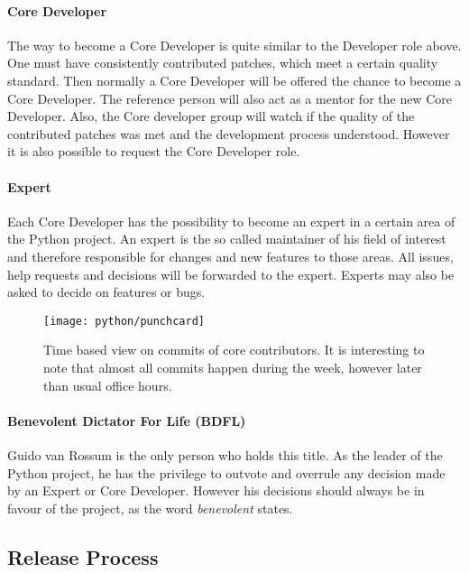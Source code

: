 \paragraph{Core Developer}

The way to become a Core Developer is quite similar to the Developer role
above. One must have consistently contributed patches, which meet a certain
quality standard. Then normally a Core Developer will be offered the chance to
become a Core Developer. The reference person will also act as a mentor for the
new Core Developer. Also, the Core developer group will watch if the quality of
the contributed patches was met and the development process understood. However
it is also possible to request the Core Developer role.

\paragraph{Expert}

Each Core Developer has the possibility to become an expert in a certain area
of the Python project. An expert is the so called maintainer of his field of
interest and therefore responsible for changes and new features to those areas.
All issues, help requests and decisions will be forwarded to the expert.
Experts may also be asked to decide on features or bugs.

\begin{figure}[hbtp]
  \centering
  \texttt{[image: python/punchcard]}
  \caption[Time Based View on Commits, Python]
  {Time based view on commits of core contributors. It is interesting to note
    that almost all commits happen during the week, however later than usual
    office hours.}
\end{figure}

\paragraph{Benevolent Dictator For Life (BDFL)}

Guido van Rossum is the only person who holds this title. As the leader of the
Python project, he has the privilege to outvote and overrule any decision made
by an Expert or Core Developer. However his decisions should always be in
favour of the project, as the word \emph{benevolent} states.


\subsection{Release Process} %

